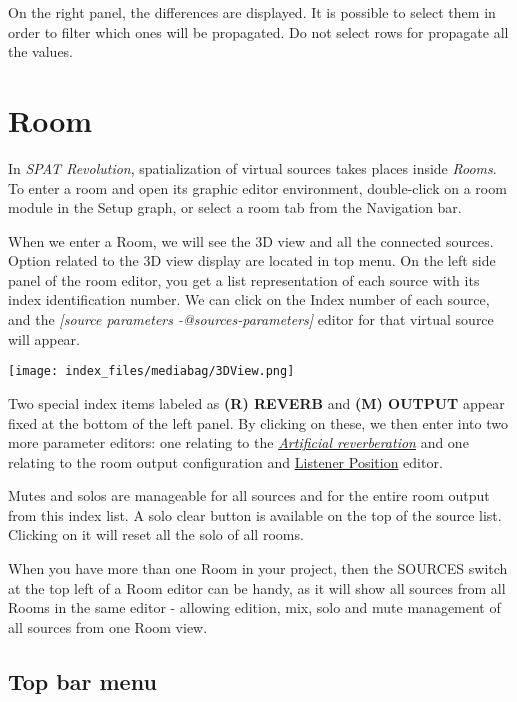 \documentclass[
  letterpaper,
  DIV=11,
  numbers=noendperiod]{scrreport}
\begin{document}
On the right panel, the differences are displayed. It is possible to
select them in order to filter which ones will be propagated. Do not
select rows for propagate all the values.

\hypertarget{room}{%
\chapter{Room}\label{room}}

In \emph{SPAT Revolution}, spatialization of virtual sources takes
places inside \emph{Rooms}. To enter a room and open its graphic editor
environment, double-click on a room module in the Setup graph, or select
a room tab from the Navigation bar.

When we enter a Room, we will see the 3D view and all the connected
sources. Option related to the 3D view display are located in top menu.
On the left side panel of the room editor, you get a list representation
of each source with its index identification number. We can click on the
Index number of each source, and the \emph{{[}source parameters
-@sources-parameters{]}} editor for that virtual source will appear.

\texttt{[image: index\_files/mediabag/3DView.png]}

Two special index items labeled as \textbf{(R) REVERB} and \textbf{(M)
OUTPUT} appear fixed at the bottom of the left panel. By clicking on
these, we then enter into two more parameter editors: one relating to
the \emph{\href{Spat_Environment_Artificial_Reverberation.md}{Artificial
reverberation}} and one relating to the room output configuration and
\href{Spatialisation_Technology_Listener_Position.md}{Listener Position}
editor.

Mutes and solos are manageable for all sources and for the entire room
output from this index list. A solo clear button is available on the top
of the source list. Clicking on it will reset all the solo of all rooms.

When you have more than one Room in your project, then the SOURCES
switch at the top left of a Room editor can be handy, as it will show
all sources from all Rooms in the same editor - allowing edition, mix,
solo and mute management of all sources from one Room view.

\hypertarget{top-bar-menu}{%
\section{Top bar menu}\label{top-bar-menu}}
\end{document}
